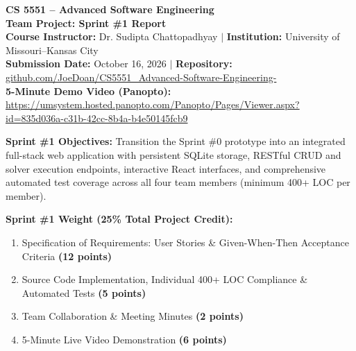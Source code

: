 \documentclass[10pt,letterpaper]{article}
\begin{document}
\begin{center}
    {\LARGE\bfseries\sffamily\color{headerdark} CS 5551 -- Advanced Software Engineering}\\[0.25em]
    {\huge\bfseries\sffamily\color{umkcblue} Team Project: Sprint \#1 Report}\\[0.4em]
    \normalsize\sffamily
    \textbf{Course Instructor:} Dr. Sudipta Chattopadhyay \quad$|$\quad 
    \textbf{Institution:} University of Missouri--Kansas City\\[0.2em]
    \textbf{Submission Date:} October 16, 2026 \quad$|$\quad
    \textbf{Repository:} \href{https://github.com/JoeDoan/CS5551_Advanced-Software-Engineering-}{github.com/JoeDoan/CS5551\_Advanced-Software-Engineering-}\\[0.2em]
    \textbf{5-Minute Demo Video (Panopto):} \href{https://umsystem.hosted.panopto.com/Panopto/Pages/Viewer.aspx?id=835d036a-c31b-42cc-8b4a-b4e50145fcb9}{https://umsystem.hosted.panopto.com/Panopto/Pages/Viewer.aspx?id=835d036a-c31b-42cc-8b4a-b4e50145fcb9}
\end{center}

\vspace{0.3em}

\begin{tcolorbox}[sleekbox]
    \sffamily\small
    \textbf{\color{umkcblue}Sprint \#1 Objectives:} Transition the Sprint \#0 prototype into an integrated full-stack web application with persistent SQLite storage, RESTful CRUD and solver execution endpoints, interactive React interfaces, and comprehensive automated test coverage across all four team members (minimum 400+ LOC per member).
    
    \vspace{0.3em}
    \textbf{\color{umkcblue}Sprint \#1 Weight (25\% Total Project Credit):}
    \begin{enumerate}[topsep=2pt, itemsep=0pt, parsep=1pt, leftmargin=1.8em]
        \item Specification of Requirements: User Stories \& Given-When-Then Acceptance Criteria \textbf{\color{umkcblue}(12 points)}
        \item Source Code Implementation, Individual 400+ LOC Compliance \& Automated Tests \textbf{\color{umkcblue}(5 points)}
        \item Team Collaboration \& Meeting Minutes \textbf{\color{umkcblue}(2 points)}
        \item 5-Minute Live Video Demonstration \textbf{\color{umkcblue}(6 points)}
    \end{enumerate}
\end{tcolorbox}
\end{document}
